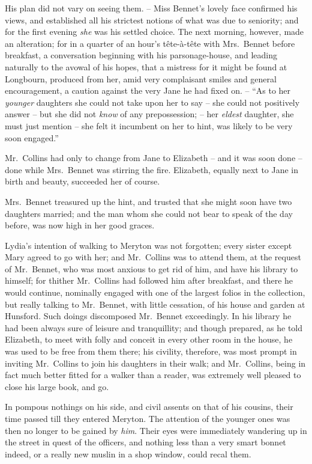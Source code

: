 His plan did not vary on seeing them. -- Miss Bennet’s
lovely face confirmed his views, and established all his
strict\-est notions of what was due to seniority; and for
the first evening \textit{she} was his settled choice. The next
morning, however, made an alteration; for in a quarter
of an hour’s tête-à-tête with Mrs.\ Bennet before breakfast,
a conversation beginning with his parsonage-house, and
leading naturally to the avowal of his hopes, that a mistress
for it might be found at Longbourn, produced from her,
amid very complaisant smiles and general encouragement,
a caution against the very Jane he had fixed on. -- “As
to her \textit{younger} daughters she could not take upon her to
say -- she could not positively answer -- but she did not
\textit{know} of any prepossession; -- her \textit{eldest} daughter, she must
just mention -- she felt it incumbent on her to hint, was
likely to be very soon engaged.”

Mr.\ Collins had only to change from Jane to Elizabeth -- and
it was soon done -- done while Mrs.\ Bennet was
stirring the fire. Elizabeth, equally next to Jane in birth
and beauty, succeeded her of course.

Mrs.\ Bennet treasured up the hint, and trusted that she
might soon have two daughters married; and the man
whom she could not bear to speak of the day before, was
now high in her good graces.

Lydia’s intention of walking to Meryton was not
forgotten; every sister except Mary agreed to go with
her; and Mr.\ Collins was to attend them, at the request
of Mr.\ Bennet, who was most anxious to get rid of him,
and have his library to himself; for thither Mr.\ Collins
had followed him after breakfast, and there he would
continue, nominally engaged with one of the largest folios
in the collection, but really talking to Mr.\ Bennet, with
little cessation, of his house and garden at Hunsford.
Such doings discomposed Mr.\ Bennet exceedingly. In his
library he had been always sure of leisure and tranquillity;
and though prepared, as he told Elizabeth, to meet with
folly and conceit in every other room in the house, he was
used to be free from them there; his civility, therefore,
was most prompt in inviting Mr.\ Collins to join his
daughters in their walk; and Mr.\ Collins, being in fact
much better fitted for a walker than a reader, was extremely
well pleased to close his large book, and go.

In pompous nothings on his side, and civil assents on
that of his cousins, their time passed till they entered
Meryton. The attention of the younger ones was then
no longer to be gained by \textit{him}. Their eyes were immediately
wandering up in the street in quest of the officers,
and nothing less than a very smart bonnet indeed, or
a really new muslin in a shop window, could recal them.

